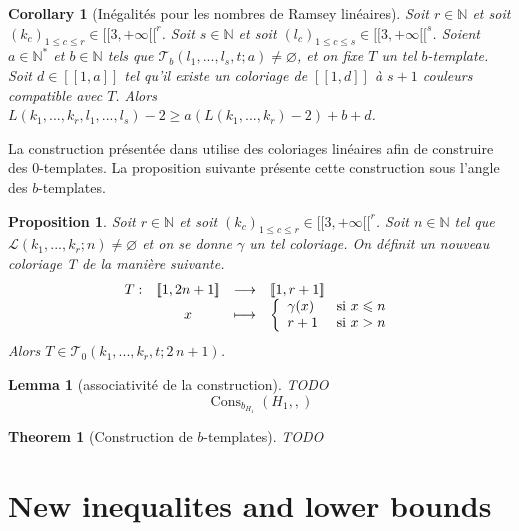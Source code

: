 \documentclass{article}
\newtheorem{theorem}[definition]{Theorem}
\newtheorem{corollary}[definition]{Corollary}
\newtheorem{lemma}[definition]{Lemma}
\newtheorem{proposition}[definition]{Proposition}
\DeclareMathOperator{\cons}{Cons}
\begin{document}
\begin{corollary}[Inégalités pour les nombres de Ramsey linéaires]
\label{thm:ineq}
Soit \(r \in \mathbb{N}\) et soit \((k_c)_{1 \leqslant c \leqslant r} \in {[\![3, +\infty[\![}^r\). Soit \(s \in \mathbb{N}\) et soit \((l_c)_{1 \leqslant c \leqslant s} \in {[\![3, +\infty[\![}^s\). Soient \(a \in \mathbb{N}^*\) et \(b \in \mathbb{N}\) tels que \(\mathcal{T}_b(l_1, ..., l_s, t; a) \neq \varnothing\), et on fixe \(T\) un tel \(b\)-template. Soit \(d \in [\![1, a]\!]\) tel qu'il existe un coloriage de \([\![1, d]\!]\) à \(s + 1\) couleurs compatible avec \(T\).
Alors \(L(k_1, ..., k_r, l_1, ..., l_s) - 2 \geqslant a (L(k_1, ..., k_r) - 2) + b + d\).
\end{corollary}

La construction présentée dans \cite{rowleyramseyabott} utilise des coloriages linéaires afin de construire des \(0\)-templates. La proposition suivante présente cette construction sous l'angle des \(b\)-templates.
\begin{proposition}
Soit \(r \in \mathbb{N}\) et soit \((k_c)_{1 \leqslant c \leqslant r} \in {[\![3, +\infty[\![}^r\). Soit \(n \in \mathbb{N}\) tel que \(\mathcal{L}(k_1, ..., k_r; n) \neq \varnothing\) et on se donne \(\gamma\) un tel coloriage. On définit un nouveau coloriage T de la manière suivante.
\[\begin{array}{c c c l}
	T : & [\![1, 2 n + 1]\!] & \longrightarrow & [\![1, r + 1]\!] \\
	 & x & \longmapsto & \left\{
		\begin{array}{l l}
			\gamma(x) & ~\text{si}~ x \leqslant n \\
			r + 1 & ~\text{si}~ x > n \\
		\end{array}
		\right.
\end{array}\]
Alors \(T \in \mathcal{T}_0(k_1, ..., k_r, t; 2 \, n + 1)\).
\end{proposition}

\begin{lemma}[associativité de la construction]
TODO
\[
\cons_{b_{H_1}}(H_1, , )
\]
\end{lemma}

\begin{theorem}[Construction de \(b\)-templates]
TODO
\end{theorem}

\section{New inequalites and lower bounds}
\label{sec:bounds}
\end{document}
